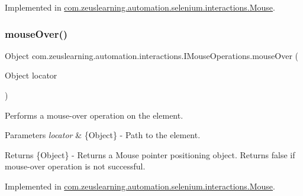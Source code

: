 Implemented in \hyperlink{classcom_1_1zeuslearning_1_1automation_1_1selenium_1_1interactions_1_1Mouse_a0d8034eab9e3c8b27c38d862f75219cc}{com.\+zeuslearning.\+automation.\+selenium.\+interactions.\+Mouse}.

\hypertarget{interfacecom_1_1zeuslearning_1_1automation_1_1interactions_1_1IMouseOperations_a5e9e5bc4ccb27ca23924a3058c686374}{}\label{interfacecom_1_1zeuslearning_1_1automation_1_1interactions_1_1IMouseOperations_a5e9e5bc4ccb27ca23924a3058c686374} 
\subsubsection{\texorpdfstring{mouse\+Over()}{mouseOver()}}
{\footnotesize\ttfamily Object com.\+zeuslearning.\+automation.\+interactions.\+I\+Mouse\+Operations.\+mouse\+Over (\begin{DoxyParamCaption}\item[{Object}]{locator }\end{DoxyParamCaption})}

Performs a mouse-\/over operation on the element.


\begin{DoxyParams}{Parameters}
{\em locator} & \{Object\} -\/ Path to the element.\\
\hline
\end{DoxyParams}
\begin{DoxyReturn}{Returns}
\{Object\} -\/ Returns a Mouse pointer positioning object. Returns {\ttfamily false} if mouse-\/over operation is not successful. 
\end{DoxyReturn}


Implemented in \hyperlink{classcom_1_1zeuslearning_1_1automation_1_1selenium_1_1interactions_1_1Mouse_ae3becce24a081e1ad2151b383c2d9404}{com.\+zeuslearning.\+automation.\+selenium.\+interactions.\+Mouse}.

\hypertarget{interfacecom_1_1zeuslearning_1_1automation_1_1interactions_1_1IMouseOperations_ad30fa777ed68e069dc06a8ebb219eaed}{}\label{interfacecom_1_1zeuslearning_1_1automation_1_1interactions_1_1IMouseOperations_ad30fa777ed68e069dc06a8ebb219eaed} 
